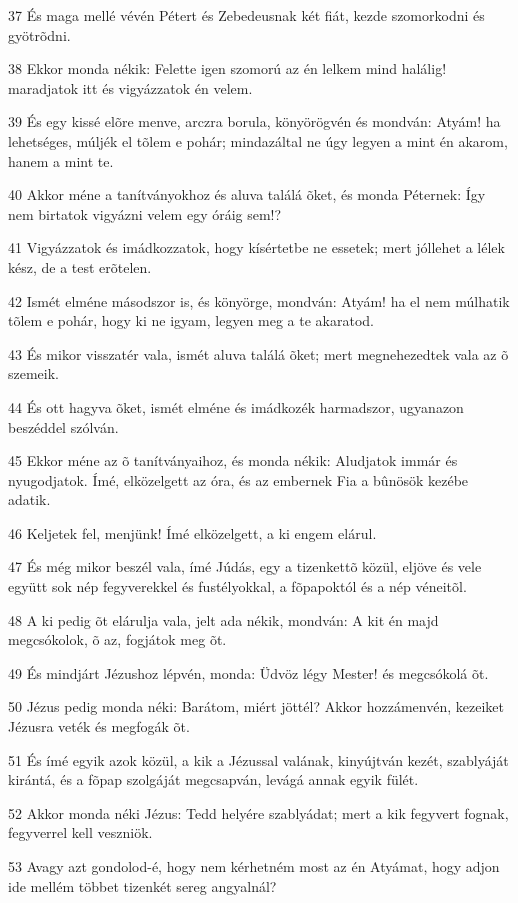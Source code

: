 \par 37 És maga mellé vévén Pétert és Zebedeusnak két fiát, kezde szomorkodni és gyötrõdni.
\par 38 Ekkor monda nékik: Felette igen szomorú az én lelkem mind halálig! maradjatok itt és vigyázzatok én velem.
\par 39 És egy kissé elõre menve, arczra borula, könyörögvén és mondván: Atyám! ha lehetséges, múljék el tõlem e  pohár; mindazáltal ne úgy legyen a mint én akarom, hanem a mint te.
\par 40 Akkor méne a tanítványokhoz és aluva találá õket, és monda Péternek: Így nem birtatok vigyázni velem egy óráig sem!?
\par 41 Vigyázzatok és imádkozzatok, hogy kísértetbe ne essetek; mert jóllehet a lélek kész, de a test erõtelen.
\par 42 Ismét elméne másodszor is, és könyörge, mondván: Atyám! ha el nem múlhatik tõlem e pohár, hogy ki ne igyam, legyen meg a te akaratod.
\par 43 És mikor visszatér vala, ismét aluva találá õket; mert megnehezedtek vala az õ szemeik.
\par 44 És ott hagyva õket, ismét elméne és imádkozék harmadszor, ugyanazon beszéddel szólván.
\par 45 Ekkor méne az õ tanítványaihoz, és monda nékik: Aludjatok immár és nyugodjatok. Ímé, elközelgett az óra, és az embernek Fia a bûnösök kezébe adatik.
\par 46 Keljetek fel, menjünk! Ímé elközelgett, a ki engem elárul.
\par 47 És még mikor beszél vala, ímé Júdás, egy a tizenkettõ közül, eljöve és vele együtt sok nép fegyverekkel és fustélyokkal, a fõpapoktól és a nép véneitõl.
\par 48 A ki pedig õt elárulja vala, jelt ada nékik, mondván: A kit én majd megcsókolok, õ az, fogjátok meg õt.
\par 49 És mindjárt Jézushoz lépvén, monda: Üdvöz légy Mester! és megcsókolá õt.
\par 50 Jézus pedig monda néki: Barátom, miért jöttél? Akkor hozzámenvén, kezeiket Jézusra veték és megfogák õt.
\par 51 És ímé egyik azok közül, a kik a Jézussal valának, kinyújtván kezét, szablyáját kirántá, és a fõpap szolgáját megcsapván, levágá annak egyik fülét.
\par 52 Akkor monda néki Jézus: Tedd helyére szablyádat; mert a kik fegyvert fognak, fegyverrel kell veszniök.
\par 53 Avagy azt gondolod-é, hogy nem kérhetném most az én Atyámat, hogy adjon ide mellém többet tizenkét sereg angyalnál?
